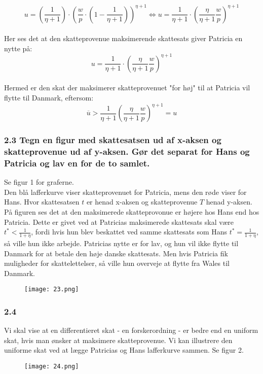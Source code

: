 \documentclass[a4paper, 12pt]{article}
\begin{document}
$$u = \left( \dfrac{1}{\eta + 1} \right) \cdot \left( \dfrac{w}{p} \cdot \left( 1 - \frac{1}{\eta + 1} \right) \right)^{\eta + 1} \Leftrightarrow u =  \dfrac{1}{\eta + 1} \cdot \left( \dfrac{\eta}{\eta + 1}  \dfrac{w}{p} \right)^{\eta + 1} $$
\\
Her ses det at den skatteprovenue maksimerende skattesats giver Patricia en nytte på:
$$u =  \dfrac{1}{\eta + 1} \cdot \left( \dfrac{\eta}{\eta + 1}  \dfrac{w}{p} \right)^{\eta + 1} $$
\\
Hermed er den skat der maksimerer skatteprovenuet "for høj" til at Patricia vil flytte til Danmark, eftersom:
$$\overline{u} > \dfrac{1}{\eta +1} \left( \dfrac{\eta}{\eta + 1} \dfrac{w}{p} \right)^{\eta + 1} = u$$

\subsubsection*{2.3 Tegn en figur med skattesatsen ud af x-aksen og skatteprovenue ud af y-aksen. Gør det separat for Hans og Patricia og lav en for de to samlet.}
Se figur 1 for graferne. 
\\
Den blå lafferkurve viser skatteprovenuet for Patricia, mens den røde viser for Hans. Hvor skattesatsen $t$ er henad x-aksen og skatteprovenue $T$ henad y-aksen.
\\
På figuren ses det at den maksimerede skatteprovonue er højere hos Hans end hos Patricia. Dette er givet ved at Patricias maksimerede skattesats skal være $t^{*} < \frac{1}{1 + \eta}$, fordi hvis hun blev beskattet ved samme skattesats som Hans $t^{*} = \frac{1}{1 + \eta}$, så ville hun ikke arbejde. Patricias nytte er for lav, og hun vil ikke flytte til Danmark for at  betale den høje danske skattesats. Men hvis Patricia fik muligheder for skattelettelser, så ville hun overveje at flytte fra Wales til Danmark.

\FloatBarrier
\begin{center}
	\begin{figure}[!ht]	
		\centering	
\texttt{[image: 23.png]}
		\caption{}
	\end{figure}
\end{center}
\FloatBarrier

\subsubsection*{2.4 }
Vi skal vise at en differentieret skat - en forskerordning - er bedre end en uniform skat, hvis man ønsker at maksimere skatteprovenue. Vi kan illustrere den uniforme skat ved at lægge Patricias og Hans lafferkurve sammen. Se figur 2.
\\
\FloatBarrier
\begin{center}
	\begin{figure}[!ht]	
		\centering	
\texttt{[image: 24.png]}
		\caption{}
	\end{figure}
\end{center}
\FloatBarrier
\end{document}

